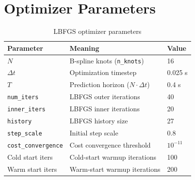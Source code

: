 \documentclass[11pt,a4paper]{article}
\begin{document}
\section{Optimizer Parameters}

\begin{table}[h]
\centering
\caption{LBFGS optimizer parameters}
\label{tab:optimizer}
\begin{tabular}{@{}lll@{}}
\toprule
Parameter & Meaning & Value \\
\midrule
$N$                & B-spline knots (\texttt{n\_knots})       & 16       \\
$\Delta t$         & Optimization timestep                     & 0.025 s  \\
$T$                & Prediction horizon ($N \cdot \Delta t$)   & 0.4 s    \\
\texttt{num\_iters}& LBFGS outer iterations                   & 40       \\
\texttt{inner\_iters} & LBFGS inner iterations                 & 20       \\
\texttt{history}   & LBFGS history size                       & 27       \\
\texttt{step\_scale}& Initial step scale                      & 0.8      \\
\texttt{cost\_convergence} & Cost convergence threshold       & $10^{-11}$ \\
Cold start iters   & Cold-start warmup iterations              & 100      \\
Warm start iters   & Warm-start warmup iterations              & 200      \\
\bottomrule
\end{tabular}
\end{table}
\end{document}
